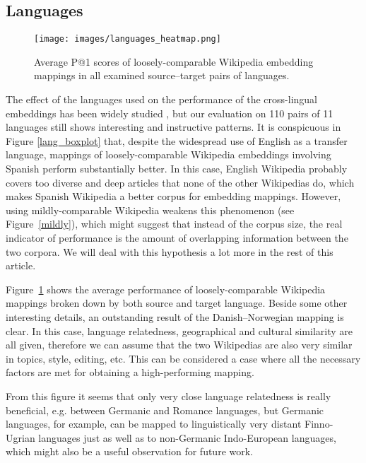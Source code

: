 \documentclass[11pt]{article}
\begin{document}
\subsection{Languages}
    
    \begin{figure}[htbp]
        \centering
        \texttt{[image: images/languages\_heatmap.png]}
        \caption{Average P@1 scores of loosely-comparable Wikipedia embedding mappings in all examined source--target pairs of languages.}
        \label{fig:lang_heatmap}
    \end{figure}
    
    The effect of the languages used on the performance of the cross-lingual embeddings has been widely studied \cite{vulic-etal-2019-really, dubossarsky-etal-2020-secret, doval-etal-2020-robustness}, but our evaluation on 110 pairs of 11 languages still shows interesting and instructive patterns. It is conspicuous in Figure \ref{lang_boxplot} that, despite the widespread use of English as a transfer language, mappings of loosely-comparable Wikipedia embeddings involving Spanish perform substantially better. In this case, English Wikipedia probably covers too diverse and deep articles that none of the other Wikipedias do, which makes Spanish Wikipedia a better corpus for embedding mappings. However, using mildly-comparable Wikipedia weakens this phenomenon (see Figure~\ref{mildly}), which might suggest that instead of the corpus size, the real indicator of performance is the amount of overlapping information between the two corpora. We will deal with this hypothesis a lot more in the rest of this article.
 
    Figure~\ref{fig:lang_heatmap} shows the average performance of loosely-comparable Wikipedia mappings broken down by both source and target language. Beside some other interesting details, an outstanding result of the Danish--Norwegian mapping is clear. In this case, language relatedness, geographical and cultural similarity are all given, therefore we can assume that the two Wikipedias are also very similar in topics, style, editing, etc. This can be considered a case where all the necessary factors are met for obtaining a high-performing mapping.
    
    From this figure it seems that only very close language relatedness is really beneficial, e.g. between Germanic and Romance languages, but Germanic languages, for example, can be mapped to linguistically very distant Finno-Ugrian languages just as well as to non-Germanic Indo-European languages, which might also be a useful observation for future work.
    
\end{document}
